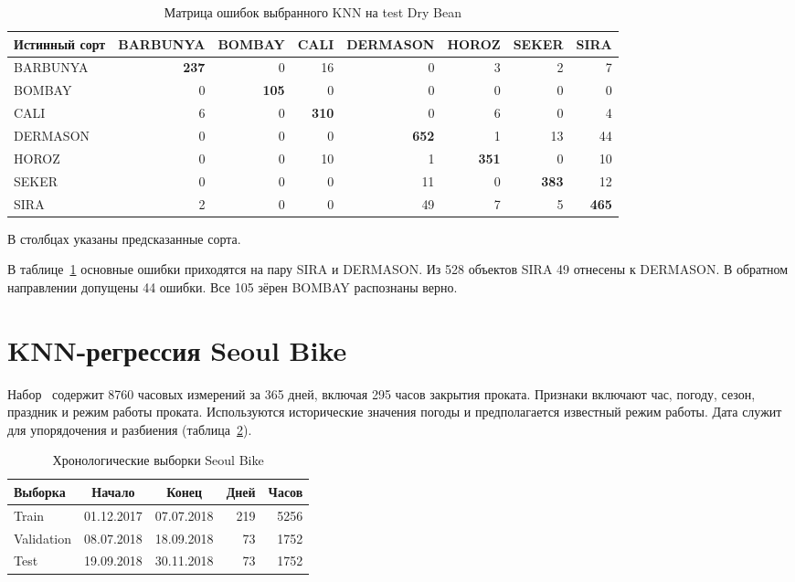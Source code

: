 \documentclass[a4paper,12pt]{article}
\begin{document}
\begin{table}[H]
\centering
\caption{Матрица ошибок выбранного KNN на test Dry Bean}
\label{tab:confusion}
\small
\setlength{\tabcolsep}{3.5pt}
\begin{tabular}{lrrrrrrr}
\toprule
Истинный сорт & BARBUNYA & BOMBAY & CALI & DERMASON & HOROZ & SEKER & SIRA \\
\midrule
BARBUNYA & \textbf{237} & 0 & 16 & 0 & 3 & 2 & 7 \\
BOMBAY & 0 & \textbf{105} & 0 & 0 & 0 & 0 & 0 \\
CALI & 6 & 0 & \textbf{310} & 0 & 6 & 0 & 4 \\
DERMASON & 0 & 0 & 0 & \textbf{652} & 1 & 13 & 44 \\
HOROZ & 0 & 0 & 10 & 1 & \textbf{351} & 0 & 10 \\
SEKER & 0 & 0 & 0 & 11 & 0 & \textbf{383} & 12 \\
SIRA & 2 & 0 & 0 & 49 & 7 & 5 & \textbf{465} \\
\bottomrule
\end{tabular}
\par\smallskip В столбцах указаны предсказанные сорта.
\end{table}

В таблице~\ref{tab:confusion} основные ошибки приходятся на пару SIRA и DERMASON. Из 528 объектов SIRA 49 отнесены к DERMASON. В обратном направлении допущены 44 ошибки. Все 105 зёрен BOMBAY распознаны верно.

\section{KNN-регрессия Seoul Bike}

Набор~\cite{seoul} содержит 8760 часовых измерений за 365 дней, включая 295 часов закрытия проката. Признаки включают час, погоду, сезон, праздник и режим работы проката. Используются исторические значения погоды и предполагается известный режим работы. Дата служит для упорядочения и разбиения (таблица~\ref{tab:dates}).

\begin{table}[H]
\centering
\caption{Хронологические выборки Seoul Bike}
\label{tab:dates}
\small
\begin{tabular}{lccrr}
\toprule
Выборка & Начало & Конец & Дней & Часов \\
\midrule
Train & 01.12.2017 & 07.07.2018 & 219 & 5256 \\
Validation & 08.07.2018 & 18.09.2018 & 73 & 1752 \\
Test & 19.09.2018 & 30.11.2018 & 73 & 1752 \\
\bottomrule
\end{tabular}
\end{table}
\end{document}
